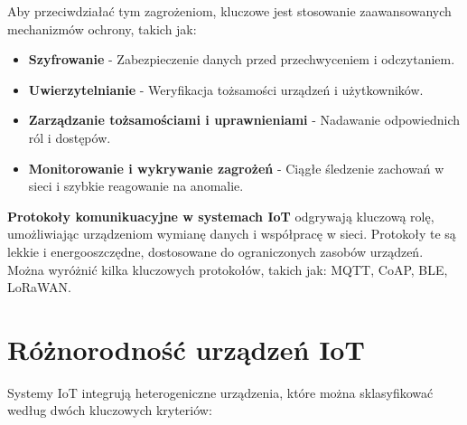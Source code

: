 Aby przeciwdziałać tym zagrożeniom, kluczowe jest stosowanie zaawansowanych mechanizmów ochrony, takich jak:
\begin{itemize}
    \item \textbf{Szyfrowanie} - Zabezpieczenie danych przed przechwyceniem i odczytaniem.

    \item \textbf{Uwierzytelnianie} - Weryfikacja tożsamości urządzeń i użytkowników.
    
    \item \textbf{Zarządzanie tożsamościami i uprawnieniami} - Nadawanie odpowiednich ról i dostępów.
    
    \item \textbf{Monitorowanie i wykrywanie zagrożeń } - Ciągłe śledzenie zachowań w sieci i szybkie reagowanie na anomalie.
\end{itemize}

\textbf{Protokoły komunikuacyjne w systemach IoT} odgrywają kluczową rolę, umożliwiając urządzeniom wymianę danych i współpracę w sieci. Protokoły te są lekkie i energooszczędne, dostosowane do ograniczonych zasobów urządzeń. Można wyróżnić kilka kluczowych protokołów, takich jak: MQTT, CoAP, BLE, LoRaWAN.

\section{Różnorodność urządzeń IoT}
Systemy IoT integrują heterogeniczne urządzenia, które można sklasyfikować według dwóch kluczowych kryteriów:


